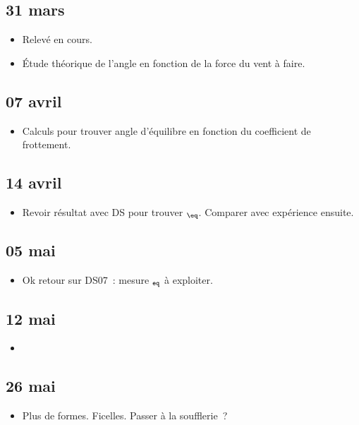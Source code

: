 \documentclass[a4paper, 11pt, final, garamond]{book}
\begin{document}
\subsection{31 mars}
\begin{itemize}
  \item Relevé en cours.
  \item Étude théorique de l'angle en fonction de la force du vent à faire.
\end{itemize}

\subsection{07 avril}
\begin{itemize}
  \item Calculs pour trouver angle d'équilibre en fonction du coefficient de
    frottement.
\end{itemize}

\subsection{14 avril}
\begin{itemize}
  \item Revoir résultat avec DS pour trouver $\tt_{\eq}$. Comparer avec
    expérience ensuite.
\end{itemize}

\subsection{05 mai}
\begin{itemize}
  \item Ok retour sur DS07~: mesure $\tt_{eq}$ à exploiter.
\end{itemize}

\subsection{12 mai}
\begin{itemize}
  \item 
\end{itemize}

\subsection{26 mai}
\begin{itemize}
  \item Plus de formes. Ficelles. Passer à la soufflerie~?
\end{itemize}
\end{document}
